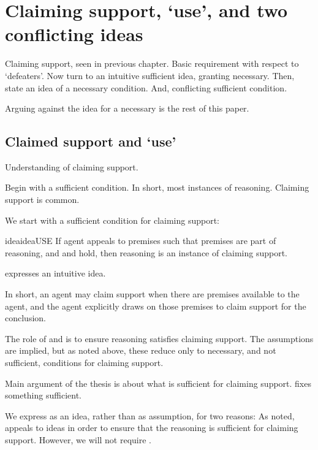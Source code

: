 \chapter{Claiming support, `use', and two conflicting ideas}
\label{cha:claiming-support-use}

\begin{note}
  Claiming support, seen in previous chapter.
  Basic requirement with respect to `defeaters'.
  Now turn to an intuitive sufficient idea, granting necessary.
  Then, state an idea of a necessary condition.
  And, conflicting sufficient condition.

  Arguing against the idea for a necessary is the rest of this paper.
\end{note}


\section{Claimed support and `use'}
\label{sec:claimed-support-use}

\begin{note}
  Understanding of claiming support.

  Begin with a sufficient condition.
  In short, most instances of reasoning.
  Claiming support is common.
\end{note}

\begin{note}
  We start with a sufficient condition for claiming support:
  \begin{restatable}{idea}{ideaUSE}\label{prem:bP}\label{prop:USE}
    If agent appeals to premises such that premises are part of reasoning, and \ideaCSA{} and \ideaCSB{} hold, then reasoning is an instance of claiming support.
  \end{restatable}

  \USE{} expresses an intuitive idea.

  In short, an agent may claim support when there are premises available to the agent, and the agent explicitly draws on those premises to claim support for the conclusion.

  The role of \ideaCSA{} and \ideaCSB{} is to ensure reasoning satisfies claiming support.
  The assumptions are implied, but as noted above, these reduce only to necessary, and not sufficient, conditions for claiming support.

  Main argument of the thesis is about what is sufficient for claiming support.
  \USE{} fixes something sufficient.

  We express \USE{} as an idea, rather than as assumption, for two reasons:
  As noted, appeals to ideas in order to ensure that the reasoning is sufficient for claiming support.
  However, we will not require \USE{}.
\end{note}

